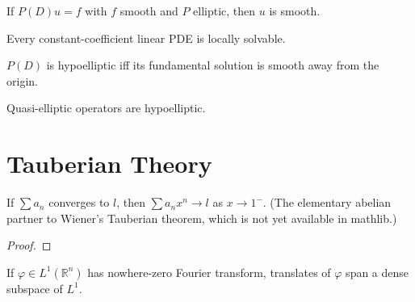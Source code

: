 \begin{theorem}
  \label{thm:elliptic-regularity}
  \leanok
  If $P(D) u = f$ with $f$ smooth and $P$ elliptic, then $u$ is
  smooth.
\end{theorem}

\begin{theorem}
  \label{thm:local-solvability}
  \leanok
  Every constant-coefficient linear PDE is locally solvable.
\end{theorem}

\begin{theorem}
  \label{thm:hypoelliptic}
  \leanok
  $P(D)$ is hypoelliptic iff its fundamental solution is smooth away
  from the origin.
\end{theorem}

\begin{theorem}
  \label{thm:quasiElliptic-hypoelliptic}
  \leanok
  Quasi-elliptic operators are hypoelliptic.
\end{theorem}

\chapter{Tauberian Theory}

\begin{theorem}
  \label{thm:abel-limit}
  \leanok
  If $\sum a_n$ converges to $l$, then $\sum a_n x^n \to l$ as
  $x \to 1^-$. (The elementary abelian partner to Wiener's Tauberian
  theorem, which is not yet available in mathlib.)
\end{theorem}
\begin{proof}
  \leanok
\end{proof}


\begin{theorem}
  \label{thm:wiener-lemma}
  \leanok
  If $\varphi \in L^1(\mathbb R^n)$ has nowhere-zero Fourier
  transform, translates of $\varphi$ span a dense subspace of $L^1$.
\end{theorem}

